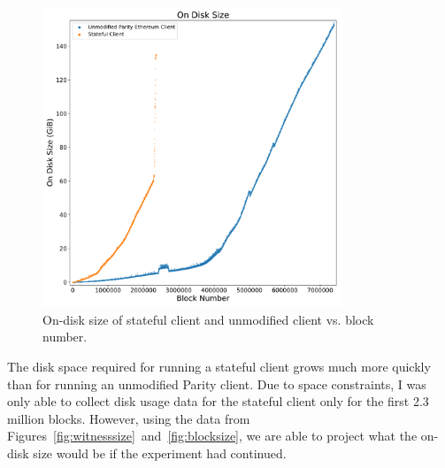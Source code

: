 \documentclass[12pt]{article}
\newcommand{\figurewidth}{0.8\textwidth}
\begin{document}
\begin{figure}[H]
  \centering
  \includegraphics[width=\figurewidth]{../figures/results/graphs/background/on-disk-size.pdf}
  \caption{On-disk size of stateful client and unmodified client vs. block number.}
  \label{fig:ondisksize}
\end{figure}

The disk space required for running a stateful client grows much more quickly than for running an unmodified Parity client. Due to space constraints, I was only able to collect disk usage data for the stateful client only for the first 2.3 million blocks. However, using the data from Figures~\ref{fig:witnesssize}~and~\ref{fig:blocksize}, we are able to project what the on-disk size would be if the experiment had continued.
\end{document}
